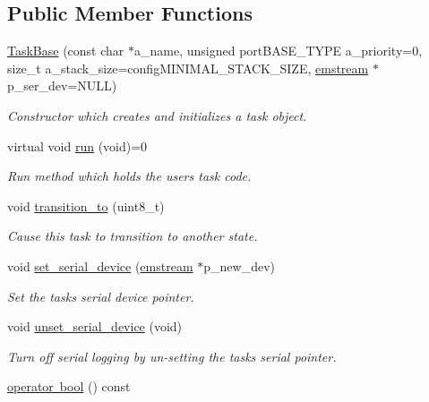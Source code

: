 \subsection*{Public Member Functions}
\begin{DoxyCompactItemize}
\item 
\mbox{\hyperlink{class_task_base_ae8e359a838bed17302e4f21146dba612}{Task\+Base}} (const char $\ast$a\+\_\+name, unsigned port\+B\+A\+S\+E\+\_\+\+T\+Y\+PE a\+\_\+priority=0, size\+\_\+t a\+\_\+stack\+\_\+size=config\+M\+I\+N\+I\+M\+A\+L\+\_\+\+S\+T\+A\+C\+K\+\_\+\+S\+I\+ZE, \mbox{\hyperlink{classemstream}{emstream}} $\ast$p\+\_\+ser\+\_\+dev=N\+U\+LL)
\begin{DoxyCompactList}\small\item\em Constructor which creates and initializes a task object. \end{DoxyCompactList}\item 
virtual void \mbox{\hyperlink{class_task_base_adcf6036ad9c860051ccf392ba5e7dbbc}{run}} (void)=0
\begin{DoxyCompactList}\small\item\em Run method which holds the user\textquotesingle{}s task code. \end{DoxyCompactList}\item 
void \mbox{\hyperlink{class_task_base_af70bf7c9cb6dfccdb1dbf41b7c6d2ecf}{transition\+\_\+to}} (uint8\+\_\+t)
\begin{DoxyCompactList}\small\item\em Cause this task to transition to another state. \end{DoxyCompactList}\item 
void \mbox{\hyperlink{class_task_base_ad088ca82db29301b019b1efde85156be}{set\+\_\+serial\+\_\+device}} (\mbox{\hyperlink{classemstream}{emstream}} $\ast$p\+\_\+new\+\_\+dev)
\begin{DoxyCompactList}\small\item\em Set the task\textquotesingle{}s serial device pointer. \end{DoxyCompactList}\item 
void \mbox{\hyperlink{class_task_base_a0e1cc480afef3708598b6b217b281a7b}{unset\+\_\+serial\+\_\+device}} (void)
\begin{DoxyCompactList}\small\item\em Turn off serial logging by un-\/setting the task\textquotesingle{}s serial pointer. \end{DoxyCompactList}\item 
\mbox{\hyperlink{class_task_base_a0dbf9678429543f33c9c8f82511a3887}{operator bool}} () const

\end{DoxyCompactItemize}
